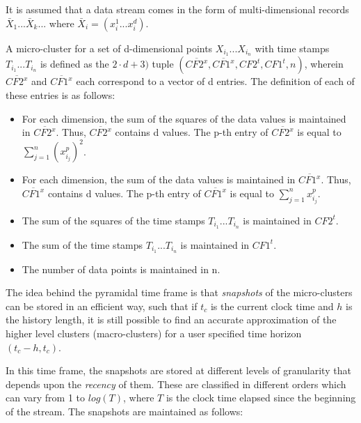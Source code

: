 \documentclass{llncs}
\begin{document}
It is assumed that a data stream comes in the form of multi-dimensional records $\bar X_1 ... \bar X_k ...$ where $\bar X_i = (x^1_i ... x^d_i)$.

\begin{definition}\cite{clustreamOrig}

A micro-cluster for a set of d-dimensional points $X_{i_1} ...X_{i_n}$ with time stamps
$T_{i_1} ...T_{i_n}$ is defined as the $2 \cdot d + 3)$ tuple $(\overline{CF2^x},\overline{CF1^x},CF2^t,CF1^t,n)$, wherein $\overline{CF2^x}$ and $\overline{CF1^x}$ each correspond to a vector of d entries. The definition of each of these entries is as follows: 

\begin{itemize}
 \item For each dimension, the sum of the squares of the data values is maintained in $\overline{CF2^x}$. Thus, $\overline{CF2^x}$ contains d values. The p-th entry of $\overline{CF2^x}$ is equal to $\sum^n_{j=1} (x^p_{i_j})^2$. 
 \item For each dimension, the sum of the data values is maintained in $\overline{CF1^x}$. Thus, $\overline{CF1^x}$ contains d values. The p-th entry of $\overline{CF1^x}$ is equal to $\sum^n_{j=1} x^p_{i_j}$.
 \item The sum of the squares of the time stamps $T_{i_1} ...T_{i_n}$ is maintained in $CF2^t$.
 \item The sum of the time stamps $T_{i_1} ...T_{i_n}$ is maintained in $CF1^t$.
 \item The number of data points is maintained in n.
\end{itemize}

\end{definition}

The idea behind the pyramidal time frame is that \textit{snapshots} of the micro-clusters can be stored in an efficient way, such that if $t_c$ is the current clock time and $h$ is the history length, it is still possible to find an accurate approximation of the higher level clusters (macro-clusters) for a user specified time horizon $(t_c - h, t_c)$.

In this time frame, the snapshots are stored at different levels of granularity that depends upon the \textit{recency} of them. These are classified in different orders which can vary from 1 to $log(T)$, where $T$ is the clock time elapsed since the beginning of the stream. The snapshots are maintained as follows:
\end{document}
